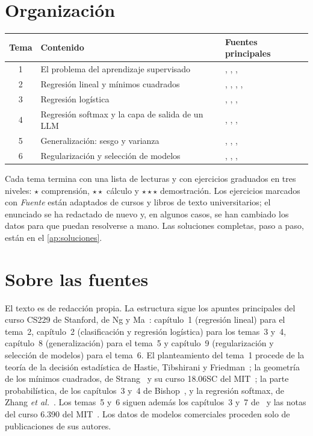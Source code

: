 \documentclass[11pt,a4paper,twoside,openany]{book}
\begin{document}
\section*{Organización}
\begin{center}\small
\begin{tabular}{@{}cll@{}}
\toprule
Tema & Contenido & Fuentes principales \\
\midrule
1 & El problema del aprendizaje supervisado & \cite{cs229}, \cite{esl}, \cite{mit6390}, \cite{bishop} \\
2 & Regresión lineal y mínimos cuadrados & \cite{cs229}, \cite{strang}, \cite{mit1806}, \cite{bishop}, \cite{d2l} \\
3 & Regresión logística & \cite{cs229}, \cite{bishop}, \cite{esl}, \cite{mit6390} \\
4 & Regresión softmax y la capa de salida de un LLM & \cite{cs229}, \cite{d2l}, \cite{bishop}, \cite{llama2} \\
5 & Generalización: sesgo y varianza & \cite{cs229}, \cite{esl}, \cite{bishop}, \cite{d2l} \\
6 & Regularización y selección de modelos & \cite{cs229}, \cite{esl}, \cite{mit6390}, \cite{d2l} \\
\bottomrule
\end{tabular}
\end{center}

Cada tema termina con una lista de lecturas y con ejercicios graduados en tres niveles: $\star$ comprensión, $\star\star$ cálculo y $\star\star\star$ demostración. Los ejercicios marcados con \emph{Fuente} están adaptados de cursos y libros de texto universitarios; el enunciado se ha redactado de nuevo y, en algunos casos, se han cambiado los datos para que puedan resolverse a mano. Las soluciones completas, paso a paso, están en el \cref{ap:soluciones}.

\section*{Sobre las fuentes}
El texto es de redacción propia. La estructura sigue los apuntes principales del curso CS229 de Stanford, de Ng y Ma~\cite{cs229}: capítulo~1 (regresión lineal) para el tema~2, capítulo~2 (clasificación y regresión logística) para los temas~3 y~4, capítulo~8 (generalización) para el tema~5 y capítulo~9 (regularización y selección de modelos) para el tema~6. El planteamiento del tema~1 procede de la teoría de la decisión estadística de Hastie, Tibshirani y Friedman~\cite[§2.4]{esl}; la geometría de los mínimos cuadrados, de Strang~\cite[§4.2--4.3]{strang} y su curso 18.06SC del MIT~\cite{mit1806}; la parte probabilística, de los capítulos~3 y~4 de Bishop~\cite{bishop}, y la regresión softmax, de Zhang \emph{et al.}~\cite[§4.1]{d2l}. Los temas~5 y~6 siguen además los capítulos~3 y~7 de~\cite{esl} y las notas del curso 6.390 del MIT~\cite{mit6390}. Los datos de modelos comerciales proceden solo de publicaciones de sus autores.
\end{document}
